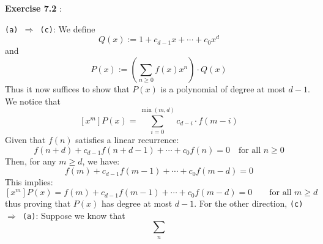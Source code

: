 \documentclass{article}
\newenvironment{solution}[1][\proofname]{
    \proof[\textbf{Solution:}] \renewcommand{\qedsymbol}{$\bell$}
}{\endproof}
\begin{document}
\newpage

\noindent \textbf{Exercise 7.2} : 

\begin{solution}
    \texttt{(a) $\Rightarrow$ (c)}: We define 
    \[ Q(x) := 1 + c_{d-1} x + \cdots + c_0 x^d \]
    and 
    \[ P(x) := \left( \sum_{n \geq 0} f(x) x^n \right) \cdot Q(x) \]
    Thus it now suffices to show that $P(x)$ is a polynomial of degree at most $d - 1$. We notice that 
    \[ [x^m] P(x) = \sum_{i = 0}^{\min(m, d)} c_{d - i} \cdot f(m - i) \]
    Given that $f(n)$ satisfies a linear recurrence:
    \[
    f(n + d) + c_{d-1} f(n + d - 1) + \cdots + c_0 f(n) = 0 \quad \text{for all } n \geq 0
    \]
    Then, for any $m \geq d$, we have:
    \[ f(m) + c_{d-1} f(m - 1) + \cdots + c_0 f(m - d) = 0 \]
    This implies:
    \[ [x^m] P(x) = f(m) + c_{d-1} f(m - 1) + \cdots + c_0 f(m - d) = 0 \qquad \text{for all } m \geq d \] 
    thus proving that $P(x)$ has degree at most $d - 1$. For the other direction, \texttt{(c) $\Rightarrow$ (a)}: Suppose we know that 
    \[ \sum_{n } \]
\end{solution}
\end{document}
